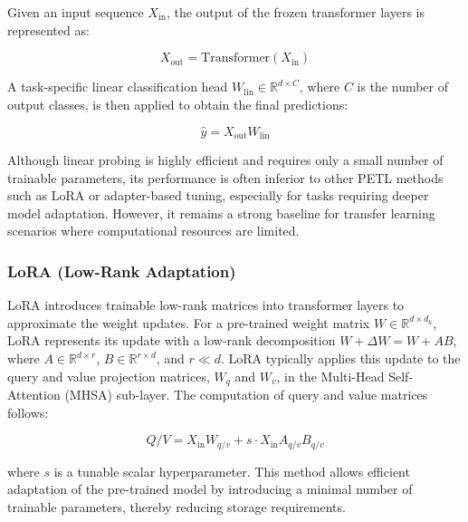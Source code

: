 \documentclass[11pt]{article}
\begin{document}
Given an input sequence $X_{\text{in}}$, the output of the frozen transformer layers is represented as:

\begin{equation}
X_{\text{out}} = \text{Transformer}(X_{\text{in}})
\end{equation}

A task-specific linear classification head $W_{\text{lin}} \in \mathbb{R}^{d \times C}$, where $C$ is the number of output classes, is then applied to obtain the final predictions:

\begin{equation}
\hat{y} = X_{\text{out}} W_{\text{lin}}
\end{equation}

Although linear probing is highly efficient and requires only a small number of trainable parameters, its performance is often inferior to other PETL methods such as LoRA or adapter-based tuning, especially for tasks requiring deeper model adaptation. However, it remains a strong baseline for transfer learning scenarios where computational resources are limited.

\subsubsection{LoRA (Low-Rank Adaptation)}
LoRA introduces trainable low-rank matrices into transformer layers to approximate the weight updates. For a pre-trained weight matrix $W \in \mathbb{R}^{d \times d_k}$, LoRA represents its update with a low-rank decomposition $W + \Delta W = W + AB$, where $A \in \mathbb{R}^{d \times r}$, $B \in \mathbb{R}^{r \times d}$, and $r \ll d$. LoRA typically applies this update to the query and value projection matrices, $W_q$ and $W_v$, in the Multi-Head Self-Attention (MHSA) sub-layer. The computation of query and value matrices follows:

\begin{equation}
Q/V = X_{\text{in}} W_{q/v} + s \cdot X_{\text{in}} A_{q/v} B_{q/v}
\end{equation}

where $s$ is a tunable scalar hyperparameter. This method allows efficient adaptation of the pre-trained model by introducing a minimal number of trainable parameters, thereby reducing storage requirements.
\end{document}
